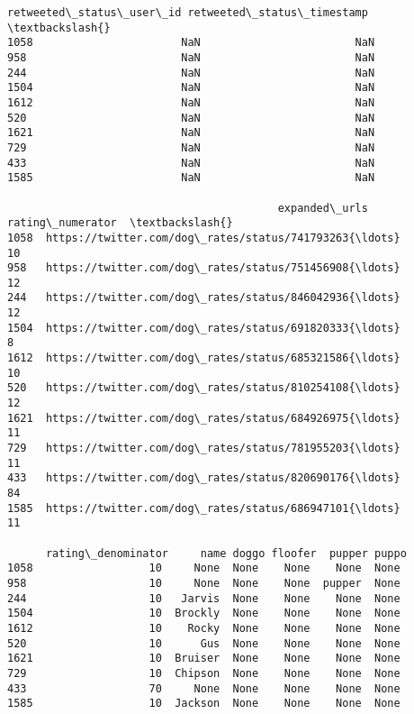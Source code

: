 \documentclass[11pt]{article}
\begin{document}
\begin{tcolorbox}[breakable, size=fbox, boxrule=.5pt, pad at break*=1mm, opacityfill=0]
\begin{Verbatim}[commandchars=\\\{\}]
      retweeted\_status\_user\_id retweeted\_status\_timestamp  \textbackslash{}
1058                       NaN                        NaN
958                        NaN                        NaN
244                        NaN                        NaN
1504                       NaN                        NaN
1612                       NaN                        NaN
520                        NaN                        NaN
1621                       NaN                        NaN
729                        NaN                        NaN
433                        NaN                        NaN
1585                       NaN                        NaN

                                          expanded\_urls  rating\_numerator  \textbackslash{}
1058  https://twitter.com/dog\_rates/status/741793263{\ldots}                10
958   https://twitter.com/dog\_rates/status/751456908{\ldots}                12
244   https://twitter.com/dog\_rates/status/846042936{\ldots}                12
1504  https://twitter.com/dog\_rates/status/691820333{\ldots}                 8
1612  https://twitter.com/dog\_rates/status/685321586{\ldots}                10
520   https://twitter.com/dog\_rates/status/810254108{\ldots}                12
1621  https://twitter.com/dog\_rates/status/684926975{\ldots}                11
729   https://twitter.com/dog\_rates/status/781955203{\ldots}                11
433   https://twitter.com/dog\_rates/status/820690176{\ldots}                84
1585  https://twitter.com/dog\_rates/status/686947101{\ldots}                11

      rating\_denominator     name doggo floofer  pupper puppo
1058                  10     None  None    None    None  None
958                   10     None  None    None  pupper  None
244                   10   Jarvis  None    None    None  None
1504                  10  Brockly  None    None    None  None
1612                  10    Rocky  None    None    None  None
520                   10      Gus  None    None    None  None
1621                  10  Bruiser  None    None    None  None
729                   10  Chipson  None    None    None  None
433                   70     None  None    None    None  None
1585                  10  Jackson  None    None    None  None
\end{Verbatim}
\end{tcolorbox}
        
\end{document}
